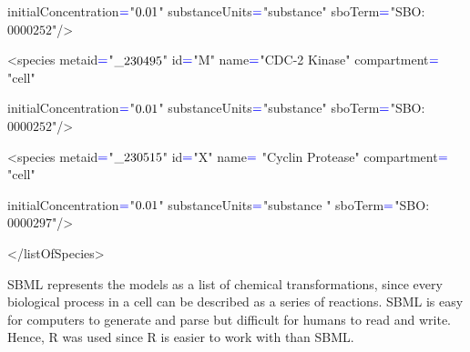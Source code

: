 \documentclass[landscape,a1paper,fontscale=0.46]{baposter}
\begin{document}
\begin{poster}
{\begin{flushleft}
{{  \qquad \color{red} initialConcentration$\color{blue}=$\color{blue}"$\color{black}0.01$\color{blue}" \color{red} substanceUnits$\color{blue}=$\color{blue}"\color{black}substance\color{blue}" \color{red} sboTerm$\color{blue}=$\color{blue}"\color{black}SBO:$0000252$\color{blue}"/>
 
 \quad <\color{red}species metaid$\color{blue}=$\color{blue}"$\color{black}\_230495$\color{blue}" \color{red} id$\color{blue}=$\color{blue}"\color{black}M\color{blue}" \color{red} name$\color{blue}=$\color{blue}"\color{black}CDC-2 Kinase\color{blue}" \color{red} compartment$\color{blue}=$\color{blue}"\color{black}cell\color{blue}" 
 
 \qquad \quad\color{red} initialConcentration$\color{blue}=$\color{blue}"$\color{black}0.01$\color{blue}" \color{red} substanceUnits$\color{blue}=$\color{blue}"\color{black}substance\color{blue}" \color{red} sboTerm$\color{blue}=$\color{blue}"\color{black}SBO:$0000252$\color{blue}"/>
 
 \quad <\color{red}species metaid$\color{blue}=$\color{blue}"$\color{black}\_230515$\color{blue}" \color{red} id$\color{blue}=$\color{blue}"\color{black}X\color{blue}" \color{red} name$ \color{blue}=$ \color{blue} "\color{black}Cyclin Protease\color{blue}" \color{red} compartment$\color{blue}=$\color{blue}"\color{black}cell\color{blue}" 
 
 \qquad \quad\color{red} initialConcentration$\color{blue}=$\color{blue}"$\color{black} 0.01$\color{blue}" \color{red} substanceUnits$\color{blue}=$\color{blue}"\color{black}substance \color{blue}" \color{red} sboTerm$\color{blue}=$\color{blue}"\color{black}SBO:$0000297$\color{blue}"/>
 
 \vspace{-0.5em}
 <\color{red}/listOfSpecies\color{blue}>}}
 \end{flushleft}
 
\noindent SBML represents the models as a list of chemical transformations, since every biological process in a cell can be described as a series of reactions. SBML is easy for computers to generate and parse but difficult for humans to read and write. Hence, R was used since R is easier to work with than SBML. 
 }
 

\end{poster}
\end{document}
